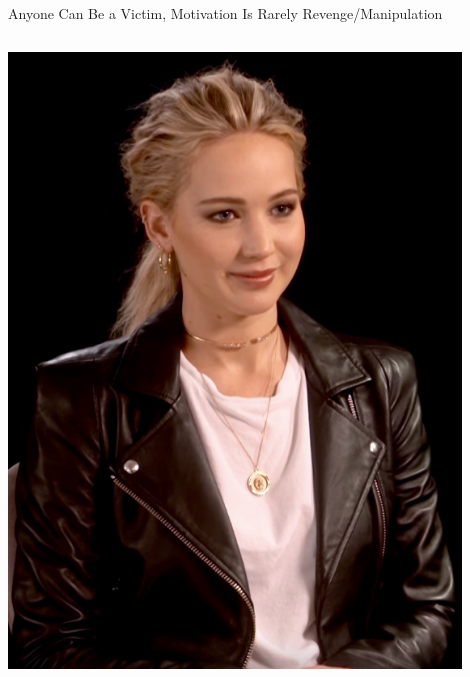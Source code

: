 \documentclass[nobackground,dvipsnames,table,aspectratio=169]{beamer}
\begin{document}
\begin{frame}{Anyone Can Be a Victim, Motivation Is Rarely Revenge/Manipulation}
    \begin{columns}
            \centering
            \begin{columns}
                    \centering
                    \includegraphics[width=0.9\textwidth]{jennifer-lawrence}
                    \centering

\end{columns}
\end{columns}
\end{frame}
\end{document}
